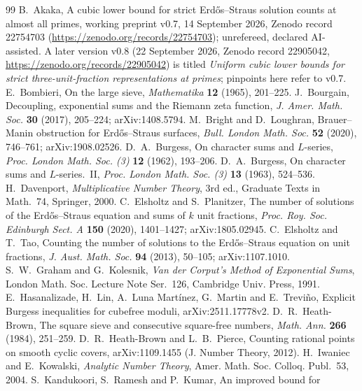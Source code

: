 \documentclass[11pt,reqno]{amsart}
\theoremstyle{definition}
\begin{document}
\begin{thebibliography}{99}
 B.~Akaka, A cubic lower bound for strict
Erd\H{o}s--Straus solution counts at almost all primes, working preprint
v0.7, 14 September 2026, Zenodo record 22754703
(\url{https://zenodo.org/records/22754703}); unrefereed, declared
AI-assisted.  A later version v0.8 (22 September 2026, Zenodo record
22905042, \url{https://zenodo.org/records/22905042}) is titled
\emph{Uniform cubic lower bounds for strict three-unit-fraction
representations at primes}; pinpoints here refer to v0.7.
 E.~Bombieri, On the large sieve, \emph{Mathematika}
\textbf{12} (1965), 201--225.
 J.~Bourgain, Decoupling, exponential sums and the
Riemann zeta function, \emph{J. Amer. Math. Soc.} \textbf{30} (2017),
205--224; arXiv:1408.5794.
 M.~Bright and D.~Loughran, Brauer--Manin obstruction for
Erd\H{o}s--Straus surfaces, \emph{Bull. London Math. Soc.} \textbf{52}
(2020), 746--761; arXiv:1908.02526.
 D.~A.~Burgess, On character sums and $L$-series,
\emph{Proc. London Math. Soc. (3)} \textbf{12} (1962), 193--206.
 D.~A.~Burgess, On character sums and $L$-series.~II,
\emph{Proc. London Math. Soc. (3)} \textbf{13} (1963), 524--536.
 H.~Davenport, \emph{Multiplicative Number Theory},
3rd ed., Graduate Texts in Math.\ 74, Springer, 2000.
 C.~Elsholtz and S.~Planitzer, The number of solutions of
the Erd\H{o}s--Straus equation and sums of $k$ unit fractions,
\emph{Proc. Roy. Soc. Edinburgh Sect. A} \textbf{150} (2020),
1401--1427; arXiv:1805.02945.
 C.~Elsholtz and T.~Tao, Counting the number of solutions to
the Erd\H{o}s--Straus equation on unit fractions, \emph{J. Aust. Math.
Soc.} \textbf{94} (2013), 50--105; arXiv:1107.1010.
 S.~W.~Graham and G.~Kolesnik, \emph{Van der Corput's Method
of Exponential Sums}, London Math. Soc. Lecture Note Ser.\ 126, Cambridge
Univ. Press, 1991.
 E.~Hasanalizade, H.~Lin, A.~Luna Mart\'inez,
G.~Martin and E.~Trevi\~no, Explicit Burgess inequalities for cubefree
moduli, arXiv:2511.17778v2.
 D.~R.~Heath-Brown, The square sieve and consecutive
square-free numbers, \emph{Math. Ann.} \textbf{266} (1984), 251--259.
 D.~R.~Heath-Brown and L.~B.~Pierce, Counting rational
points on smooth cyclic covers, arXiv:1109.1455 (J. Number Theory,
2012).
 H.~Iwaniec and E.~Kowalski, \emph{Analytic Number Theory},
Amer. Math. Soc. Colloq. Publ.\ 53, 2004.
 S.~Kandukoori, S.~Ramesh and P.~Kumar, An improved bound for

\end{thebibliography}
\end{document}
